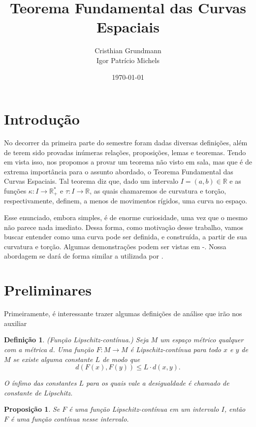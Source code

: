 \documentclass{article}
\title{Teorema Fundamental das Curvas Espaciais}
\author{Cristhian Grundmann \\ Igor Patrício Michels}
\date{\today}
\newtheorem{definition}{Definição}
\newtheorem{proposition}{Proposição}
\begin{document}
\maketitle
\section{Introdução}

No decorrer da primeira parte do semestre foram dadas diversas definições, além de terem sido provadas inúmeras relações, proposições, lemas e teoremas. Tendo em vista isso, nos propomos a provar um teorema não visto em sala, mas que é de extrema importância para o assunto abordado, o Teorema Fundamental das Curvas Espaciais. Tal teorema diz que, dado um intervalo $I =(a, b)\in \mathbb{R}$ e as funções $\kappa : I\to \mathbb{R}^*_+$ e $\tau : I\to \mathbb{R}$, as quais chamaremos de curvatura e torção, respectivamente, definem, a menos de movimentos rígidos, uma curva no espaço.

Esse enunciado, embora simples, é de enorme curiosidade, uma vez que o mesmo não parece nada imediato. Dessa forma, como motivação desse trabalho, vamos buscar entender como uma curva pode ser definida, e construída, a partir de sua curvatura e torção. Algumas demonstrações podem ser vistas em \cite{cruz}-\cite{picado}. Nossa abordagem se dará de forma similar a utilizada por \cite{coda}.

\section{Preliminares}
\label{preliminares}

Primeiramente, é interessante trazer algumas definições de análise que irão nos auxiliar

\begin{definition}(Função Lipschitz-contínua.)
    Seja $M$ um espaço métrico qualquer com a métrica $d$. Uma função $F : M\to M$ é Lipschitz-contínua para todo $x$ e $y$ de $M$ se existe alguma constante $L$ de modo que
    \[d(F(x), F(y))\leq L\cdot d(x, y).\]
    
    O ínfimo das constantes $L$ para os quais vale a desigualdade é chamado de constante de Lipschitz.
\end{definition}

\begin{proposition}
    Se $F$ é uma função Lipschitz-contínua em um intervalo $I$, então $F$ é uma função contínua nesse intervalo.
\end{proposition}
\end{document}
